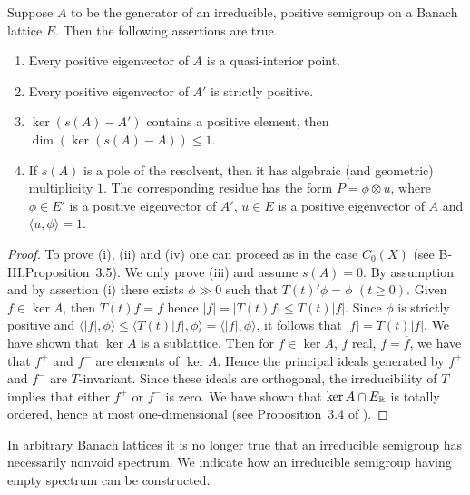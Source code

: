 \begin{proposition}\label{prop:c3-3.5}
	
	Suppose $A$ to be the generator of an irreducible, positive semigroup on a Banach lattice $E$.
	Then the following assertions are true.
	\begin{enumerate}[\upshape (i), wide, labelsep=1em, itemsep=1ex]
	\item 
	Every positive eigenvector of $A$ is a quasi-interior point.
	
	\item 
	Every positive eigenvector of $A'$ is strictly positive.
	
	\item 
	$\ker(s(A) - A')$ contains a positive element, then $\dim(\ker(s(A) - A)) \leq 1$.
	
	\item If $s(A)$ is a pole of the resolvent, then it has algebraic (and geometric) multiplicity $1$.
	The corresponding residue has the form $P = \phi\otimes u$, where $\phi \in E'$ is a positive eigenvector of $A'$, $u \in E$ is a positive eigenvector of $A$ and $\langle u,\phi \rangle = 1$.
	\end{enumerate}
\end{proposition}
	\begin{proof}
		To prove (i), (ii) and (iv) one can proceed as in the case $C_{0}(X)$ (see B-III,Proposition~3.5).
		We only prove (iii) and assume $s(A) = 0$.
		By assumption and by assertion (i) there exists $\phi \gg 0$ such that $T(t)'\phi = \phi$ $(t\geq0)$.
		Given $f \in \ker A$, then $T(t)f = f$ hence $|f| = |T(t)f| \leq T(t)|f|$.
		Since $\phi$ is strictly positive and $\langle|f|,\phi\rangle \leq \langle T(t)|f|,\phi\rangle = \langle|f|,\phi\rangle$, it follows that $|f| = T(t)|f|$.
		We have shown that $\ker A$ is a sublattice.
		Then for $f \in \ker A$, $f$ real, \ie  $f = \overline{f}$, we have that $f^{+}$ and $f^{-}$ are elements of $\ker A$.
		Hence the principal ideals generated by $f^{+}$ and $f^{-}$ are $T$-invariant.
		Since these ideals are orthogonal, the irreducibility of $T$ implies that either $f^{+}$ or $f^{-}$ is zero.
%
		We have shown that $\ker A \cap E_{\mathbb{R} }$ is totally ordered, hence at most one-dimensional (see Proposition~3.4 of \citet{schaefer:1974}).
	\end{proof}

In arbitrary Banach lattices it is no longer true that an irreducible semigroup has necessarily nonvoid spectrum.
We indicate how an irreducible semigroup having empty spectrum can be constructed.

